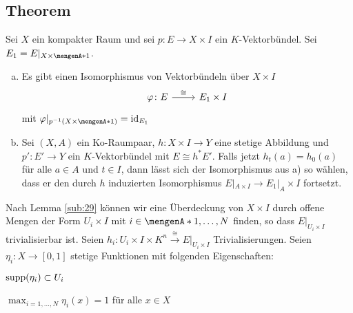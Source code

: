 \subsection[Theorem: Isomorphismus von Vektorbündeln $E$ und $E|_{X \times \set{1}} \times I$ für $X$ kompakt]{Theorem} %
\label{sub:210}
Sei $X$ ein kompakter Raum und sei $p \colon E\to X \times I$ ein $K$-Vektorbündel. Sei $E_1 = E|_{X \times \set{1}}$.
\begin{enumerate}[a)]
	\item Es gibt einen Isomorphismus von Vektorbündeln über $X \times I$
	\[
		\begin{tikzcd}
			\varphi \colon E \rar["\cong"]  & E_1 \times I 
		\end{tikzcd}
	\]
	mit $\varphi|_{p ^{-1}(X \times \set{1})} =\id_{E_1}$
	\item Sei $(X,A)$ ein Ko-Raumpaar, $h \colon X \times I \to Y$ eine stetige Abbildung und $p' \colon E' \to Y$ ein $K$-Vektorbündel mit $E \cong h^* E'$. Falls jetzt
	$h_t(a)=h_0(a)$ für alle $a \in A$ und $t \in I$, dann lässt sich der Isomorphismus aus a) so wählen, dass er den durch $h$ induzierten Isomorphismus 
	$E|_{A \times I} \to E_1|_{A} \times I$ fortsetzt.
\end{enumerate}
Nach Lemma \ref{sub:29} können wir eine Überdeckung von $X \times I$ durch offene Mengen der Form $U_i \times I$ mit $i \in \set{1,\ldots ,N}$ finden, so dass 
$E|_{U_i \times I}$ trivialisierbar ist. Seien $h_i \colon U_i \times I \times K^n \xrightarrow{\cong} E|_{U_i \times I}$ Trivialisierungen. Seien 
$\eta_i \colon X \to [0,1]$  stetige Funktionen mit folgenden Eigenschaften:

\begin{enumerate*}[(i),itemjoin={,\hspace{2em}}]
	\item $\operatorname{supp}(\eta_i) \subset U_i$
	\item $\max_{i=1,\ldots ,N} \eta_i(x)=1$ für alle $x \in X$
\end{enumerate*}

